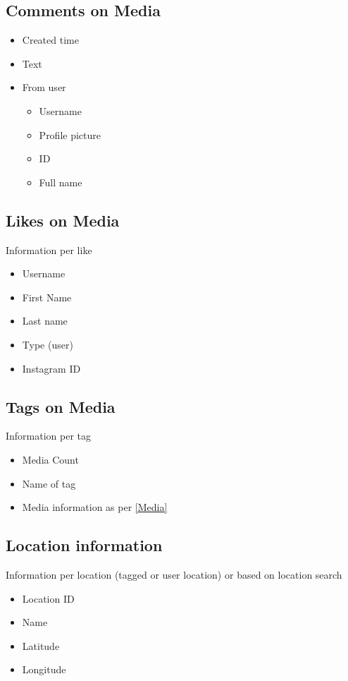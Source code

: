 \documentclass{article}
\begin{document}
\subsection{Comments on Media}\label{comment}
\begin{itemize}
	\item Created time
	\item Text
	\item From user
	\begin{itemize}
		\item Username
		\item Profile picture
		\item ID
		\item Full name
	\end{itemize}
\end{itemize}
\subsection{Likes on Media}
Information per like 
\begin{itemize}
	\item Username
	\item First Name
	\item Last name
	\item Type (user)
	\item Instagram ID
\end{itemize}

\subsection{Tags on Media}
Information per tag
\begin{itemize}
	\item Media Count
	\item Name of tag
	\item Media information as per \ref{Media}
\end{itemize}

\subsection{Location information}
Information per location (tagged or user location) or based on location search
\begin{itemize}
	\item Location ID
	\item Name
	\item Latitude 
	\item Longitude
\end{itemize}
\end{document}
